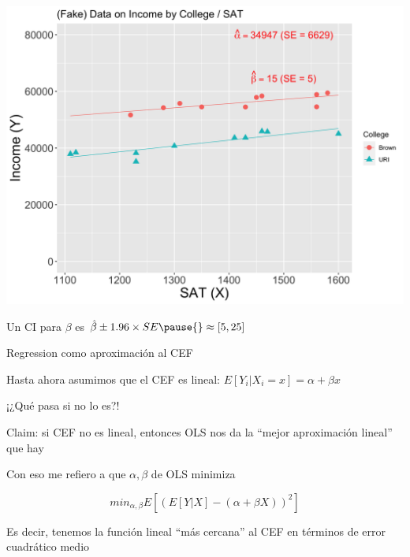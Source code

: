 \documentclass[11pt,handout,aspectratio=169]{beamer}
\newenvironment{wideitemize}{\itemize\addtolength{\itemsep}{10pt}}{\enditemize}
\begin{document}
		
\begin{frame}
	\centering
\includegraphics[scale=0.1]{fake-sat-with-trend-brown-betas-plus-ses.png}

\pause

\begin{wideitemize}
	\item
	Un CI para $\beta$ es  $\hat\beta \pm 1.96 \times SE \pause{} \approx [5,25]$
\end{wideitemize}
\end{frame}		
		

\begin{frame}{Regression como aproximación al CEF}
	\begin{wideitemize}
	\item
	Hasta ahora asumimos que el CEF es lineal: $E[Y_i | X_i = x]  = \alpha + \beta x$
	
	\item
¡¿Qué pasa si no lo es?!
	
	\pause
	\item
	Claim: si CEF no es lineal, entonces OLS nos da la ``mejor aproximación lineal'' que hay
	\pause 
	\item
	 Con eso me refiero a que $\alpha,\beta$ de OLS minimiza
	 
	 $$min_{\alpha,\beta} E[ (E[Y|X]  - (\alpha + \beta X) )^2 ]$$
	 
	 \pause
	 Es decir,  tenemos la función lineal  ``más cercana'' al CEF en términos de error cuadrático medio
	\end{wideitemize}
\end{frame}
\end{document}
